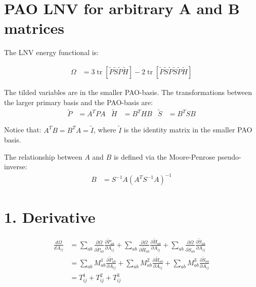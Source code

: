 \documentclass{article}
\newcommand{\tr}{\operatorname{tr}}
\begin{document}
\section*{PAO LNV for arbitrary A and B matrices}

The LNV energy functional is:

\begin{align*}
    \Omega & = 3\tr[\tilde P \tilde S \tilde P \tilde H ] - 2\tr[\tilde P \tilde S \tilde P \tilde S \tilde P \tilde H]
\end{align*}

The tilded variables are in the smaller PAO-basis. The transformations between the larger primary basis and the PAO-basis are:
\begin{align*}
    \tilde P &= A^T  P A &
    \tilde H &= B^T  H B &
    \tilde S &= B^T  S B
\end{align*}

Notice that: $ A^T B = B^T A = \tilde I $, where $\tilde I$ is the identity matrix in the smaller PAO basis.

The relationship between $A$ and $B$ is defined via the Moore-Penrose pseudo-inverse:
\begin{align*}
    B & = S^{-1} A (A^T S^{-1} A) ^{-1}
\end{align*}



\newpage
\section*{1. Derivative}

\begin{align*}
    \frac{d \Omega}{d A_{ij}}
 &= \sum_{ab} \frac{\partial \Omega}{\partial \tilde P_{ab}}  \frac{\partial \tilde P_{ab}}{\partial A_{ij}}
  + \sum_{ab} \frac{\partial \Omega}{\partial \tilde H_{ab}}  \frac{\partial \tilde H_{ab}}{\partial A_{ij}}
  + \sum_{ab} \frac{\partial \Omega}{\partial \tilde S_{ab}}  \frac{\partial \tilde S_{ab}}{\partial A_{ij}}\\
 &= \sum_{ab} M^1_{ab} \frac{\partial \tilde P_{ab}}{\partial A_{ij}}
  + \sum_{ab} M^2_{ab} \frac{\partial \tilde H_{ab}}{\partial A_{ij}}
  + \sum_{ab} M^3_{ab} \frac{\partial \tilde S_{ab}}{\partial A_{ij}}\\
 &= T^1_{ij} + T^2_{ij} + T^3_{ij}
\end{align*}
\end{document}
